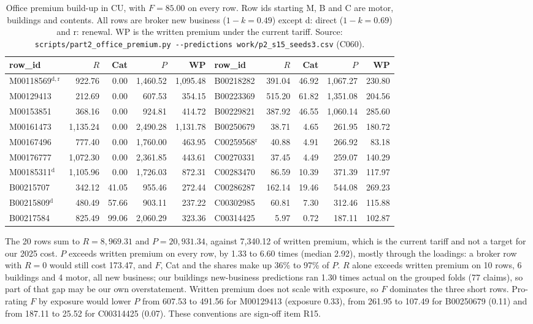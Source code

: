 \documentclass[11pt,a4paper]{article}
\newcommand{\code}[1]{\texttt{#1}}
\begin{document}
\begin{table}[htbp]
\centering\small\setlength{\tabcolsep}{4pt}
\begin{tabular}{lrrrr@{\hspace{1.4em}}lrrrr}
\toprule
row\_id & $R$ & Cat & $P$ & WP & row\_id & $R$ & Cat & $P$ & WP\\
\midrule
M00118569$^{\mathrm{d,r}}$ & 922.76 & 0.00 & 1,460.52 & 1,095.48 & B00218282 & 391.04 & 46.92 & 1,067.27 & 230.80\\
M00129413 & 212.69 & 0.00 & 607.53 & 354.15 & B00223369 & 515.20 & 61.82 & 1,351.08 & 204.56\\
M00153851 & 368.16 & 0.00 & 924.81 & 414.72 & B00229821 & 387.92 & 46.55 & 1,060.14 & 285.60\\
M00161473 & 1,135.24 & 0.00 & 2,490.28 & 1,131.78 & B00250679 & 38.71 & 4.65 & 261.95 & 180.72\\
M00167496 & 777.40 & 0.00 & 1,760.00 & 463.95 & C00259568$^{\mathrm{r}}$ & 40.88 & 4.91 & 266.92 & 83.18\\
M00176777 & 1,072.30 & 0.00 & 2,361.85 & 443.61 & C00270331 & 37.45 & 4.49 & 259.07 & 140.29\\
M00185311$^{\mathrm{d}}$ & 1,105.96 & 0.00 & 1,726.03 & 872.31 & C00283470 & 86.59 & 10.39 & 371.39 & 117.97\\
B00215707 & 342.12 & 41.05 & 955.46 & 272.44 & C00286287 & 162.14 & 19.46 & 544.08 & 269.23\\
B00215809$^{\mathrm{d}}$ & 480.49 & 57.66 & 903.11 & 237.22 & C00302985 & 60.81 & 7.30 & 312.46 & 115.88\\
B00217584 & 825.49 & 99.06 & 2,060.29 & 323.36 & C00314425 & 5.97 & 0.72 & 187.11 & 102.87\\
\bottomrule
\end{tabular}
\caption{Office premium build-up in CU, with $F = 85.00$ on every row. Row ids starting M, B and C are motor,
buildings and contents. All rows are broker new business ($1-k = 0.49$) except d: direct ($1-k = 0.69$) and r:
renewal. WP is the written premium under the current tariff. Source: \code{scripts/part2\_office\_premium.py
-{}-predictions work/p2\_s15\_seeds3.csv} (C060).}
\label{tab:op}
\end{table}

The 20 rows sum to $R = 8{,}969.31$ and $P = 20{,}931.34$, against 7,340.12 of written premium, which is the current
tariff and not a target for our 2025 cost. $P$ exceeds written premium on every row, by 1.33 to 6.60 times (median 2.92), mostly through the loadings: a broker row with $R = 0$ would still cost
173.47, and $F$, Cat and the shares make up 36\% to 97\% of $P$. $R$ alone exceeds written premium on 10 rows, 6
buildings and 4 motor, all new business; our buildings new-business predictions ran 1.30 times actual on the grouped
folds (77 claims), so part of that gap may be our own overstatement. Written premium does not scale with exposure, so
$F$ dominates the three short rows. Pro-rating $F$ by exposure would lower $P$ from 607.53 to 491.56 for M00129413
(exposure 0.33), from 261.95 to 107.49 for B00250679 (0.11) and from 187.11 to 25.52 for C00314425 (0.07). These
conventions are sign-off item R15.
\end{document}
